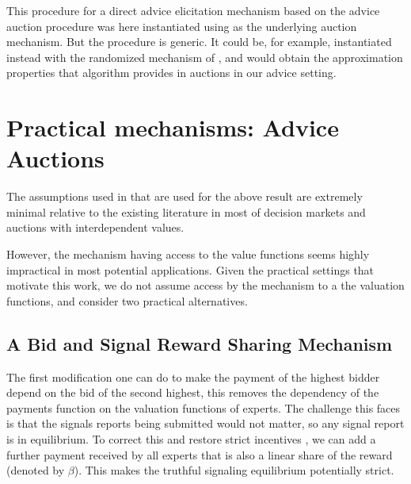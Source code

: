 This procedure for a direct advice elicitation mechanism based on the advice auction procedure was here instantiated using \cite{maskin1992auctions}  as the underlying auction mechanism. But the procedure is generic. It could be, for example, instantiated instead with the randomized mechanism of \cite{eden2018interdependent}, and would obtain the approximation properties that algorithm provides in auctions in our advice setting.


\section{Practical mechanisms: Advice Auctions}

The assumptions used in \cite{roughgarden2016optimal} that are used for the above result are extremely minimal relative to the existing literature in most of decision markets and auctions with interdependent values.

However, the mechanism having access to the value functions seems highly impractical in most potential applications.
Given the practical settings that motivate this work, 
we do not assume access by the mechanism to a the valuation functions, and consider two practical alternatives.


\subsection{A Bid and Signal Reward Sharing Mechanism}

The first modification one can do to make the payment of the highest bidder depend on the bid of the second highest, this removes the dependency of the payments function on the 
valuation functions of experts.
The challenge this faces is that the signals reports being submitted would not matter, so any signal report is in equilibrium. To correct this and restore strict incentives , we can add a further payment received by all experts that is also a linear share of the reward (denoted by $\beta$). This makes the truthful signaling equilibrium potentially strict.


